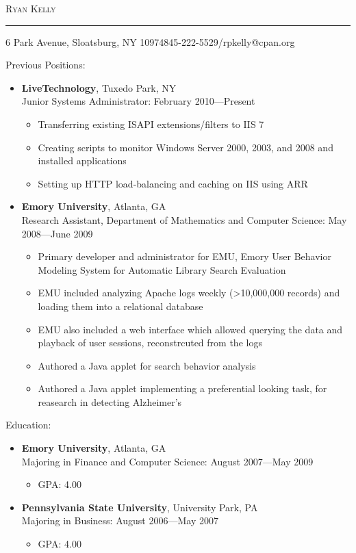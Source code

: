 \documentclass[10pt,oneside]{article}
\makeatletter
\newcommand{\name}{Ryan Kelly}
\newcommand{\addr}{6 Park Avenue, Sloatsburg, NY 10974}
\newcommand{\phone}{845-222-5529}
\newcommand{\email}{rpkelly@cpan.org}
\newcommand{\bigname}[1]{
	\begin{flushleft}\fontfamily{phv}\selectfont\Huge\scshape#1\end{flushleft}
}
\newenvironment{ressection}[1]{
	\vspace{4pt}
	{\fontfamily{phv}\selectfont\Large#1}
	\begin{itemize}
	\vspace{3pt}
}{
	\end{itemize}
}
\newcommand{\ressubitem}[1]{
	\vspace{-1pt}
	\item \begin{flushleft} #1 \end{flushleft}
}
\newcommand{\resbigitem}[3]{
	\vspace{-5pt}
	\item
	\textbf{#1}, #2 \\
	#3
}
\newenvironment{ressubsec}[3]{
	\resbigitem{#1}{#2}{#3}
	\vspace{-2pt}
	\begin{itemize}
}{
	\end{itemize}
}
\makeatother
\begin{document}
 \selectfont

\bigname{\name}

\vspace{-8pt} \rule{\textwidth}{1pt}

\vspace{-1pt} {\small \addr \hfill \phone/\email}

\vspace{8 pt}




\begin{ressection}{Previous Positions:}

	\begin{ressubsec}{LiveTechnology}{Tuxedo Park, NY}{Junior Systems Administrator: February 2010---Present}
		\ressubitem{Transferring existing ISAPI extensions/filters to IIS 7}
		\ressubitem{Creating scripts to monitor Windows Server 2000, 2003, and 2008 and installed applications}
		\ressubitem{Setting up HTTP load-balancing and caching on IIS using ARR}
	\end{ressubsec}

	\begin{ressubsec}{Emory University}{Atlanta, GA}{Research Assistant, Department of Mathematics and Computer Science: May 2008---June 2009}
		\ressubitem{Primary developer and administrator for EMU, Emory User Behavior Modeling System for Automatic Library Search Evaluation}
		\ressubitem{EMU included analyzing Apache logs weekly (>10,000,000 records) and loading them into a relational database}
		\ressubitem{EMU also included a web interface which allowed querying the data and playback of user sessions, reconstrcuted from the logs}
		\ressubitem{Authored a Java applet for search behavior analysis}
		\ressubitem{Authored a Java applet implementing a preferential looking task, for reasearch in detecting Alzheimer's }
	\end{ressubsec}

\end{ressection}


\begin{ressection}{Education:}

	\begin{ressubsec}{Emory University}{Atlanta, GA}{Majoring in Finance and Computer Science: August 2007---May 2009}
		\ressubitem{GPA: 4.00}
	\end{ressubsec}

	\begin{ressubsec}{Pennsylvania State University}{University Park, PA}{Majoring in Business: August 2006---May 2007}
		\ressubitem{GPA: 4.00}
	\end{ressubsec}

\end{ressection}
\end{document}

